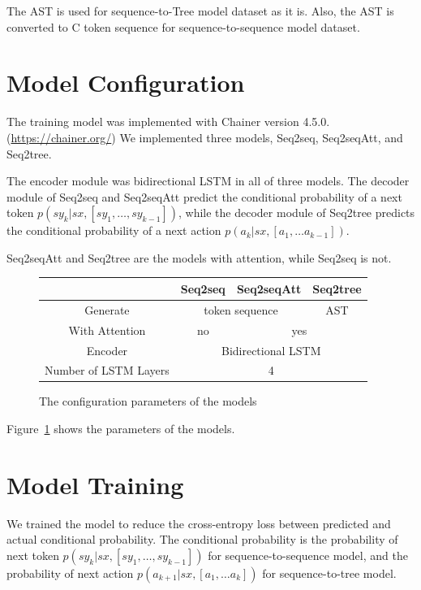 \documentclass[senior,final,11pt]{iscs-thesis}
\begin{document}
The AST is used for sequence-to-Tree model dataset as it is.
Also, the AST is converted to C token sequence for sequence-to-sequence model dataset. 

\section{Model Configuration}
The training model was implemented with Chainer version 4.5.0. (\url{https://chainer.org/})
We implemented three models, Seq2seq, Seq2seqAtt, and Seq2tree.

The encoder module was bidirectional LSTM in all of three models.
The decoder module of Seq2seq and Seq2seqAtt predict the conditional probability of a next token $ p(sy_k|sx,[sy_1,\dots,sy_{k-1}]) $,
while the decoder module of Seq2tree predicts the conditional probability of a next action $ p(a_{k}|sx,[a_1, \dots a_{k-1}]) $.

Seq2seqAtt and Seq2tree are the models with attention, while Seq2seq is not.

\begin{figure}[h]
	\begin{tabular}{|c||c|c|c|}
		\hline
		  & Seq2seq & Seq2seqAtt & Seq2tree \\ \hline \hline
		 Generate & \multicolumn{2}{|c|}{token sequence} & AST \\ \hline
		 With Attention & no & \multicolumn{2}{|c|}{yes} \\ \hline
		 Encoder & \multicolumn{3}{|c|}{Bidirectional LSTM} \\ \hline
		Number of LSTM Layers & \multicolumn{3}{|c|}{4} \\ \hline
	\end{tabular}
	\caption{The configuration parameters of the models}
	\label{fig:parameterofmodels}
\end{figure}

Figure~\ref{fig:parameterofmodels} shows the parameters of the models. 


\section{Model Training}
We trained the model to reduce the cross-entropy loss between predicted and actual conditional probability.
The conditional probability is the probability of next token $ p(sy_k|sx,[sy_1,\dots,sy_{k-1}]) $ for sequence-to-sequence model, 
and the probability of next action $p(a_{k+1}|sx,[a_1, \dots a_{k}]) $ for sequence-to-tree model.
\end{document}
